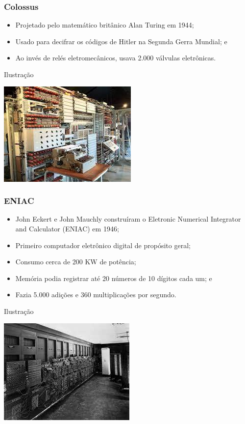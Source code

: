 \documentclass[aspectratio=169]{beamer} %
\begin{document}
\begin{frame}
	\frametitle{Colossus}
	
	\begin{itemize}
		\item Projetado pelo matemático britânico Alan Turing em 1944;
		\item Usado para decifrar os códigos de Hitler na Segunda Gerra Mundial; e
		\item Ao invés de relés eletromecânicos, usava 2.000 válvulas eletrônicas.
	\end{itemize}\vfill
	
	\begin{exampleblock}{Ilustra\c cão}
		\begin{center}
			\includegraphics[scale=0.5]{img/colossus}
		\end{center}
	\end{exampleblock}
\end{frame}

\begin{frame}
	\frametitle{ENIAC}
	
	\begin{itemize}
		\item John Eckert e John Mauchly construíram o Eletronic Numerical Integrator and Calculator (ENIAC) em 1946;
		\item Primeiro computador eletrônico digital de propósito geral;
		\item Consumo cerca de 200 KW de potência;
		\item Memória podia registrar até 20 números de 10 dígitos cada um; e 
		\item Fazia 5.000 adições e 360 multiplicações por segundo.
	\end{itemize}\vfill
	
	\begin{exampleblock}{Ilustra\c cão}
		\begin{center}
			\includegraphics[scale=0.4]{img/eniac}
		\end{center}
	\end{exampleblock}
\end{frame}
\end{document}
